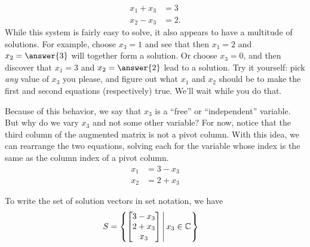\documentclass{ximera}
\begin{document}
\begin{example}
\begin{align*}
x_1+x_3&=3\\
x_2-x_3&=2.
\end{align*}
While this system is fairly easy to solve, it also appears to have a multitude of solutions.  For example, choose $x_3=1$ and see that then $x_1=2$ and $x_2=\answer{3}$ will together form a solution.  Or choose $x_3=0$, and then discover that $x_1=3$ and $x_2=\answer{2}$ lead to a solution.  Try it yourself: pick \textit{any} value of $x_3$ you please, and figure out what $x_1$ and $x_2$ should be to make the first and second equations (respectively) true.  We'll wait while you do that.

Because of this behavior, we say that $x_3$ is a ``free'' or ``independent'' variable.  But why do we vary $x_3$ and not some other variable?  For now, notice that the third column of the augmented matrix is not a pivot column.  With this idea, we can rearrange the two equations, solving each for the variable whose index is the same as the column index of a pivot column.
\begin{align*}
x_1&=3-x_3\\
x_2&=2+x_3
\end{align*}

To write the set of solution vectors in set notation, we have
\begin{align*}
S&=\setparts{\colvector{3-x_3\\2+x_3\\x_3}}{x_3\in\complex{\null}}
\end{align*}
\end{example}
\end{document}
